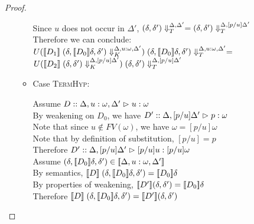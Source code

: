 \begin{proof}
\begin{enumerate}
\begin{itemize}
\begin{tabbedproof}
      \oooo Since $u$ does not occur in $\Delta'$, 
            $\restrictvals{\Delta, \Delta'}{(\delta, \delta')} =
             \restrictvals{\Delta, [p/u]\Delta'}{(\delta, \delta')}$ \\
      \oooo Therefore we can conclude:\\
      \ooox $U(\interp{D_1}\;\restricttyenv{\Delta, u:\omega, \Delta'}
                                           {(\delta, \interp{D_0}\delta, \delta')})
             \;\restrictvals{\Delta, u:\omega, \Delta'}{(\delta, \interp{D_0}\delta, \delta')}
             =$ \\
      \ooox $U(\interp{D_2}\;\restricttyenv{\Delta, [p/u]\Delta'}
                                           {(\delta, \delta')})
             \;\restrictvals{\Delta, [p/u]\Delta'}{(\delta, \delta')}$\\
    \end{tabbedproof}

  \item Case \textsc{TermHyp}:
    \begin{tabbedproof}
      \oo Assume $D :: \judgeA[{\Delta, u:\omega, \Delta'}]{u}{\omega}$ \\
      \ooo By weakening on $D_0$, we have $D' :: \judgeA[{\Delta, [p/u]\Delta'}]{p}{\omega}$ \\
      \ooo Note that since $u \not\in FV(\omega)$, we have $\omega = [p/u]\omega$ \\
      \ooo Note that by definition of substitution, $[p/u] = p$ \\
      \ooo Therefore $D' :: \judgeA[{\Delta, [p/u]\Delta'}]{[p/u]u}{[p/u]\omega}$ \\
      \ooo Assume $(\delta, \interp{D_0}\delta, \delta') \in 
                   \interp{\Delta, u:\omega, \Delta'}$ \\
      \oooo By semantics, $\interp{D}\;(\delta, \interp{D_0}\delta, \delta') = \interp{D_0}\delta$\\
      \oooo By properties of weakening, $\interp{D'}(\delta,\delta') = \interp{D_0}\delta$ \\
      \oooo Therefore $\interp{D}\;(\delta, \interp{D_0}\delta, \delta') = \interp{D'}(\delta,\delta')$ \\
    \end{tabbedproof}


\end{itemize}
\end{enumerate}
\end{proof}

